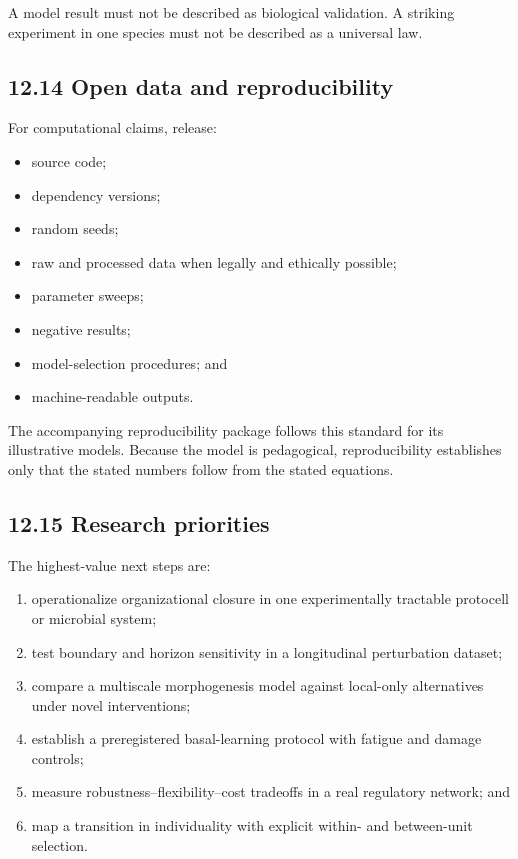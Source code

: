 \documentclass[
  11pt,
]{article}
\providecommand{\tightlist}{%
  \setlength{\itemsep}{0pt}\setlength{\parskip}{0pt}}
\begin{document}
A model result must not be described as biological validation. A
striking experiment in one species must not be described as a universal
law.

\subsection{12.14 Open data and
reproducibility}\label{open-data-and-reproducibility}

For computational claims, release:

\begin{itemize}
\tightlist
\item
  source code;
\item
  dependency versions;
\item
  random seeds;
\item
  raw and processed data when legally and ethically possible;
\item
  parameter sweeps;
\item
  negative results;
\item
  model-selection procedures; and
\item
  machine-readable outputs.
\end{itemize}

The accompanying reproducibility package follows this standard for its
illustrative models. Because the model is pedagogical, reproducibility
establishes only that the stated numbers follow from the stated
equations.

\subsection{12.15 Research priorities}\label{research-priorities}

The highest-value next steps are:

\begin{enumerate}
\def\labelenumi{\arabic{enumi}.}
\tightlist
\item
  operationalize organizational closure in one experimentally tractable
  protocell or microbial system;
\item
  test boundary and horizon sensitivity in a longitudinal perturbation
  dataset;
\item
  compare a multiscale morphogenesis model against local-only
  alternatives under novel interventions;
\item
  establish a preregistered basal-learning protocol with fatigue and
  damage controls;
\item
  measure robustness--flexibility--cost tradeoffs in a real regulatory
  network; and
\item
  map a transition in individuality with explicit within- and
  between-unit selection.
\end{enumerate}
\end{document}
